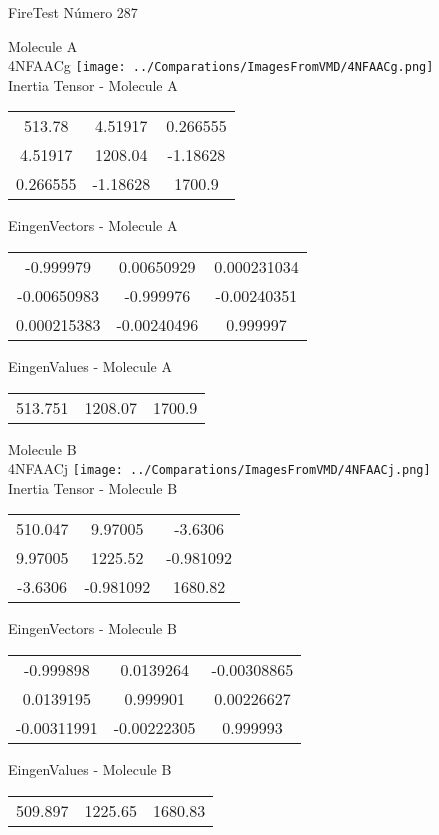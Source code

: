 \vtab[-2cm]
\begin{center}
{\large FireTest \tab Número 287}
\end{center}
\begin{multicols}{2}
\begin{center}

Molecule A \\ 
4NFAACg
\texttt{[image: ../Comparations/ImagesFromVMD/4NFAACg.png]}
\\
Inertia Tensor - Molecule A \\
\vtab

\begin{tabular}{|c c c|}
513.78	 & 	4.51917	 & 	0.266555	 \\
4.51917	 & 	1208.04	 & 	-1.18628	 \\
0.266555	 & 	-1.18628	 & 	1700.9
\end{tabular}

\vtab
 EingenVectors - Molecule A     \\
\vtab
\begin{tabular}{|c c c|}
-0.999979	 & 	0.00650929	 & 	0.000231034	 \\
-0.00650983	 & 	-0.999976	 & 	-0.00240351	 \\
0.000215383	 & 	-0.00240496	 & 	0.999997
\end{tabular}

\vtab
 EingenValues - Molecule A     \\
\vtab
\begin{tabular}{|c c c|}
513.751	 & 	1208.07	 & 	1700.9	 \\
\end{tabular}
\columnbreak

Molecule B \\ 
4NFAACj
\texttt{[image: ../Comparations/ImagesFromVMD/4NFAACj.png]}
\\
Inertia Tensor - Molecule B \\
\vtab

\begin{tabular}{|c c c|}
510.047	 & 	9.97005	 & 	-3.6306	 \\
9.97005	 & 	1225.52	 & 	-0.981092	 \\
-3.6306	 & 	-0.981092	 & 	1680.82
\end{tabular}

\vtab
 EingenVectors - Molecule B     \\
\vtab
\begin{tabular}{|c c c|}
-0.999898	 & 	0.0139264	 & 	-0.00308865	 \\
0.0139195	 & 	0.999901	 & 	0.00226627	 \\
-0.00311991	 & 	-0.00222305	 & 	0.999993
\end{tabular}

\vtab
 EingenValues - Molecule B     \\
\vtab
\begin{tabular}{|c c c|}
509.897	 & 	1225.65	 & 	1680.83	 \\
\end{tabular}

\end{center}
\end{multicols}
